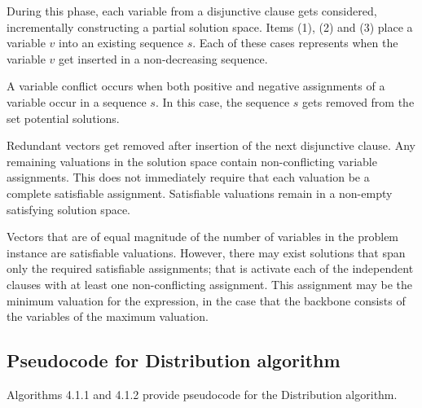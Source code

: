 \FloatBarrier

		
During this phase, each variable from a disjunctive clause gets considered, incrementally constructing a partial solution space.  Items (1), (2) and (3) place a variable $v$ into an existing sequence $s$.  Each of these cases represents when the variable $v$ get inserted in a non-decreasing sequence.

A variable conflict occurs when both positive and negative assignments of a variable occur in a sequence $s$.  In this case, the sequence $s$ gets removed from the set potential solutions.

Redundant vectors get removed after insertion of the next disjunctive clause.  Any remaining valuations in the solution space contain non-conflicting variable assignments.  This does not immediately require that each valuation be a complete satisfiable assignment. Satisfiable valuations remain in a non-empty satisfying solution space.
		
		




Vectors that are of equal magnitude of the number of variables in the problem instance are satisfiable valuations.  However, there may exist solutions that span only the required satisfiable assignments; that is activate each of the independent clauses with at least one non-conflicting assignment.  This assignment may be the minimum valuation for the expression, in the case that the backbone consists of the variables of the maximum valuation.

		
	\subsection{Pseudocode for Distribution algorithm}

Algorithms 4.1.1 and 4.1.2 provide pseudocode for the Distribution algorithm.  





%
%
%	


